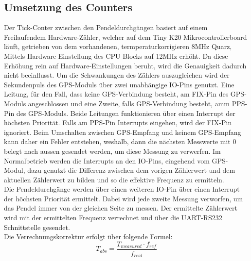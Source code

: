 \subsection{Umsetzung des Counters} %
Der Tick-Conter zwischen den Pendeldurchgängen basiert auf einem Freilaufendem Hardware-Zähler, welcher auf dem Tiny K20 Mikrocontrollerboard läuft, getrieben von dem vorhandenen, termperaturkorrigieren 8MHz Quarz, Mittels Hardware-Einstellung des CPU-Blocks auf 12MHz erhöht. Da diese Erhöhung rein auf Hardware-Einstellungen beruht, wird die Genauigkeit dadurch nicht beeinflusst. Um die Schwankungen des Zählers auszugleichen wird der Sekundenpuls des GPS-Moduls über zwei unabhängige IO-Pins genutzt. Eine Leitung, für den Fall, dass keine GPS-Verbindung besteht, am FIX-Pin des GPS-Moduls angeschlossen und eine Zweite, falls GPS-Verbindung besteht, amm PPS-Pin des GPS-Moduls. Beide Leitungen funktionieren über einen Interrupt der höchsten Priorität. Falls am PPS-Pin Interrupts eingehen, wird der FIX-Pin ignoriert. Beim Umschalten zwischen GPS-Empfang und keinem GPS-Empfang kann daher ein Fehler entstehen, weshalb, dann die nächsten Messwerte mit 0 belegt nach aussen gesendet werden, um diese Messung zu verwerfen. Im Normalbetrieb werden die Interrupts an den IO-Pins, eingehend vom GPS-Modul, dazu genutzt die Differenz zwischen dem vorigen Zählerwert und dem aktuellen Zählerwert zu bilden und so die effektive Frequenz zu ermitteln.\\ 
Die Pendeldurchgänge werden über einen weiteren IO-Pin über einen Interrupt der höchsten Priorität ermittelt. Dabei wird jede zweite Messung verworfen, um das Pendel immer von der gleichen Seite zu messen. Der ermittelte Zählerwert wird mit der ermittelten Frequenz verrechnet und über die UART-RS232 Schnittstelle gesendet.\\
Die Verrechnungskorrektur erfolgt über folgende Formel:
\[
	T_{abs} = \frac{T_{measured} \cdot f_{ref}}{f_{real}}
\]
